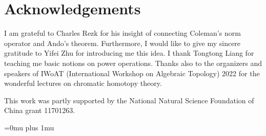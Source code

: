 \documentclass[12pt]{article}
\theoremstyle{definition}
\begin{document}
    \section*{Acknowledgements}
    I am grateful to Charles Rezk for his insight of connecting Coleman's norm operator and Ando's theorem. Furthermore, I would like to give my sincere gratitude to Yifei Zhu for introducing me this idea. I thank Tongtong Liang for teaching me basic notions on power operations. Thanks also to the organizers and speakers of IWoAT (International Workshop on Algebraic Topology) 2022 for the wonderful lectures on chromatic homotopy theory. 
    \par 
    This work was partly supported by the National Natural Science Foundation of China grant 11701263. 

    \nocite{*}
    \Urlmuskip=0mu plus 1mu\relax
    
    
\end{document}
